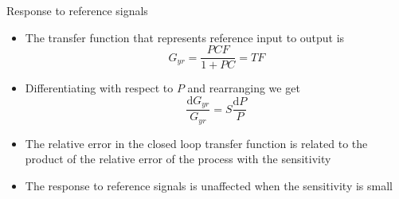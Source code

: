 \documentclass{beamer-control}
\begin{document}
\begin{frame}{Response to reference signals}
	\begin{itemize}
		\item The transfer function that represents reference input to output is 
		\[G_{yr} = \frac{PCF}{1+PC}=TF\]
		\item Differentiating with respect to $P$ and rearranging we get
		\[\frac{\mathrm{d}G_{yr}}{G_{yr}}=S\frac{\mathrm{d}P}{P}\]
		\item The relative error in the closed loop transfer function is related to the product of the relative error of the process with the sensitivity
		\item The response to reference signals is unaffected when the sensitivity is small
	\end{itemize}
\end{frame}

\SUMMARYFRAME
\FINALE
\end{document}
